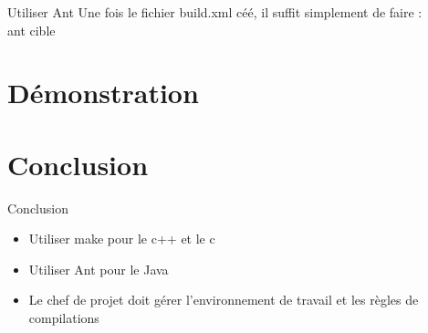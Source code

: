 \documentclass{beamer}
\begin{document}
\begin{frame}{Utiliser Ant}
    Une fois le fichier build.xml c\'e\'e, il suffit simplement de faire :\\
    ant cible
\end{frame}

\section{D\'emonstration}

\section{Conclusion}

\begin{frame}{Conclusion}
  \begin{itemize}
  \item
    Utiliser make pour le c++ et le c
  \item
    Utiliser Ant pour le Java
  \item
    Le chef de projet doit g\'erer l'environnement de travail et les r\`egles de compilations
  \end{itemize}
\end{frame}
\end{document}
